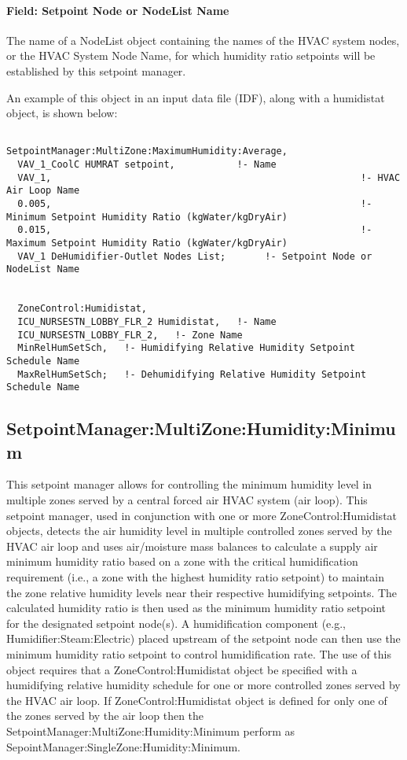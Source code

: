 \paragraph{Field: Setpoint Node or NodeList Name}\label{field-setpoint-node-or-nodelist-name-16}

The name of a NodeList object containing the names of the HVAC system nodes, or the HVAC System Node Name, for which humidity ratio setpoints will be established by this setpoint manager.

An example of this object in an input data file (IDF), along with a humidistat object, is shown below:

\begin{lstlisting}

SetpointManager:MultiZone:MaximumHumidity:Average,
  VAV_1_CoolC HUMRAT setpoint,           !- Name
  VAV_1,                                                       !- HVAC Air Loop Name
  0.005,                                                       !- Minimum Setpoint Humidity Ratio (kgWater/kgDryAir)
  0.015,                                                       !- Maximum Setpoint Humidity Ratio (kgWater/kgDryAir)
  VAV_1 DeHumidifier-Outlet Nodes List;       !- Setpoint Node or NodeList Name


  ZoneControl:Humidistat,
  ICU_NURSESTN_LOBBY_FLR_2 Humidistat,   !- Name
  ICU_NURSESTN_LOBBY_FLR_2,   !- Zone Name
  MinRelHumSetSch,   !- Humidifying Relative Humidity Setpoint Schedule Name
  MaxRelHumSetSch;   !- Dehumidifying Relative Humidity Setpoint Schedule Name
\end{lstlisting}

\subsection{SetpointManager:MultiZone:Humidity:Minimum}\label{setpointmanagermultizonehumidityminimum}

This setpoint manager allows for controlling the minimum humidity level in multiple zones served by a central forced air HVAC system (air loop). This setpoint manager, used in conjunction with one or more ZoneControl:Humidistat objects, detects the air humidity level in multiple controlled zones served by the HVAC air loop and uses air/moisture mass balances to calculate a supply air minimum humidity ratio based on a zone with the critical humidification requirement (i.e., a zone with the highest humidity ratio setpoint) to maintain the zone relative humidity levels near their respective humidifying setpoints. The calculated humidity ratio is then used as the minimum humidity ratio setpoint for the designated setpoint node(s). A humidification component (e.g., Humidifier:Steam:Electric) placed upstream of the setpoint node can then use the minimum humidity ratio setpoint to control humidification rate. The use of this object requires that a ZoneControl:Humidistat object be specified with a humidifying relative humidity schedule for one or more controlled zones served by the HVAC air loop. If ZoneControl:Humidistat object is defined for only one of the zones served by the air loop then the SetpointManager:MultiZone:Humidity:Minimum perform as SepointManager:SingleZone:Humidity:Minimum.

